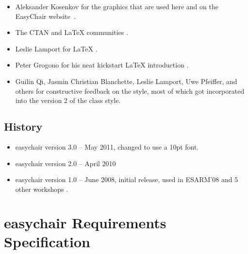 \documentclass[]{easychair}
\newcommand{\easychair}{\textsf{easychair}}
\begin{document}
\begin{itemize}
\item
Aleksander Kosenkov for the graphics that are used here and on the EasyChair 
website~\cite{easychair}.

\item
The CTAN \cite{ctan} and {\LaTeX} communities \cite{texniccenter,miktex}.

\item
Leslie Lamport for {\LaTeX} \cite{lamport-latex}.

\item
Peter Grogono for his neat kickstart {\LaTeX} introduction \cite{grogono2001}.

\item
Guilin Qi, Jasmin Christian Blanchette, Leslie Lamport, Uwe Pfeiffer,
and others for constructive feedback on the style, most of which got
incorporated into the version 2 of the class style.

\end{itemize}

\subsection{History}
\label{sect:history}

\begin{itemize}
\item
{\easychair} version 3.0 -- May 2011, changed to use a 10pt font.

\item
{\easychair} version 2.0 -- April 2010

\item
{\easychair} version 1.0 -- June 2008, initial release, used in ESARM'08 \cite{esarm-08,esarm-08-proceedings}
and 5 other workshops \cite{easychair}.

\end{itemize}

%
\label{sect:bib}

%
%
%


\appendix
\section{{\easychair} Requirements Specification}
\label{sect:easychair-requirements}
\end{document}
